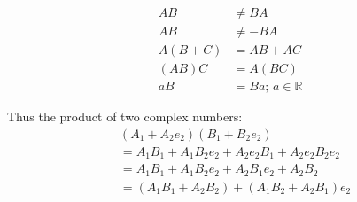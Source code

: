 \documentclass[twoside]{article}
\begin{document}
\begin{multicols*}{2}
$$\begin{aligned}
                    AB &\neq BA \\
                    AB &\neq -BA \\
                    A(B+C) &= AB + AC \\
                    (AB)C &= A(BC) \\
                    aB &= Ba;\, a \in \mathbb{R}
                \end{aligned}$$
            \par
                Thus the product of two complex numbers:
                $$\begin{aligned}
                    & (A_1 + A_2 e_2)(B_1 + B_2 e_2) \\
                    & = A_1 B_1 + A_1 B_2 e_2 + A_2 e_2 B_1 + A_2 e_2 B_2 e_2 \\
                    & = A_1 B_1 + A_1 B_2 e_2 + A_2 B_1 e_2 + A_2 B_2 \\
                    & = (A_1 B_1 + A_2 B_2) + (A_1 B_2 + A_2 B_1) e_2
                \end{aligned}$$

\end{multicols*}
\end{document}
